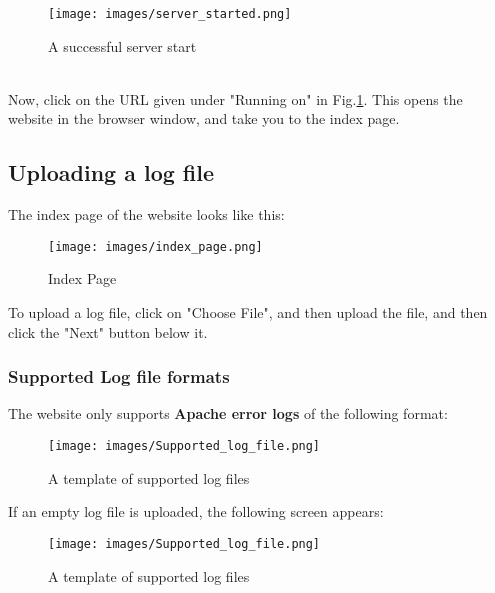 \documentclass{article}
\begin{document}
        \begin{figure}[H]
            \centering
            \texttt{[image: images/server\_started.png]}
            \caption{A successful server start}
            \label{server_started}
        \end{figure} \\

        Now, click on the URL given under "Running on" in Fig.\ref{server_started}. This opens the website in the browser window, and take you to the index page.

    \subsection{Uploading a log file}
        The index page of the website looks like this: \\

        \begin{figure}[H]
            \centering
            \texttt{[image: images/index\_page.png]}
            \caption{Index Page}
            \label{index_page}
        \end{figure}

        To upload a log file, click on "Choose File", and then upload the file, and then click the "Next" button below it.

        \subsubsection{Supported Log file formats}
        The website only supports \textbf{Apache error logs} of the following format: \\
        \begin{figure}[H]
            \centering
            \texttt{[image: images/Supported\_log\_file.png]}
            \caption{A template of supported log files}
            \label{supported_Apache}
        \end{figure}

        If an empty log file is uploaded, the following screen appears: \\
        \begin{figure}[H]
            \centering
            \texttt{[image: images/Supported\_log\_file.png]}
            \caption{A template of supported log files}
            \label{supported_Apache}
        \end{figure}
\end{document}
